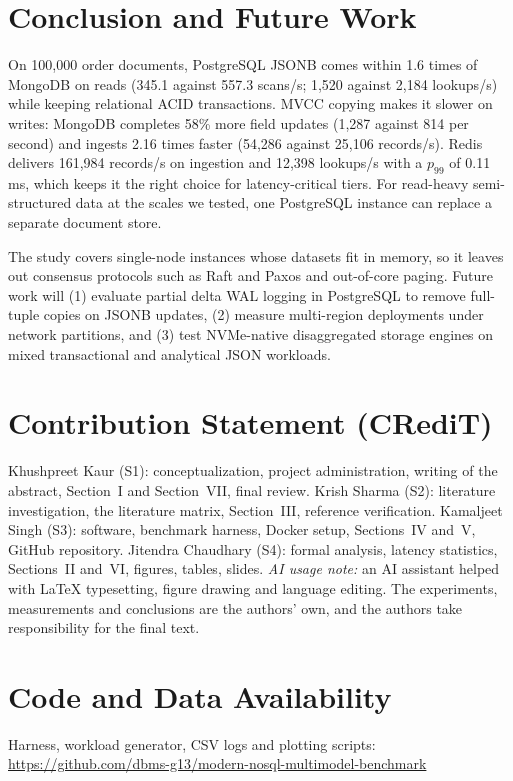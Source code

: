 \documentclass[conference,a4paper]{IEEEtran}
\begin{document}
\section{Conclusion and Future Work}
On 100,000 order documents, PostgreSQL JSONB comes within 1.6 times of MongoDB on reads (345.1 against 557.3 scans/s; 1,520 against 2,184 lookups/s) while keeping relational ACID transactions. MVCC copying makes it slower on writes: MongoDB completes 58\% more field updates (1,287 against 814 per second) and ingests 2.16 times faster (54,286 against 25,106 records/s). Redis delivers 161,984 records/s on ingestion and 12,398 lookups/s with a $p_{99}$ of 0.11\,ms, which keeps it the right choice for latency-critical tiers. For read-heavy semi-structured data at the scales we tested, one PostgreSQL instance can replace a separate document store.

The study covers single-node instances whose datasets fit in memory, so it leaves out consensus protocols such as Raft and Paxos and out-of-core paging. Future work will (1) evaluate partial delta WAL logging in PostgreSQL to remove full-tuple copies on JSONB updates, (2) measure multi-region deployments under network partitions, and (3) test NVMe-native disaggregated storage engines on mixed transactional and analytical JSON workloads.

\section*{Contribution Statement (CRediT)}
Khushpreet Kaur (S1): conceptualization, project administration, writing of the abstract, Section~I and Section~VII, final review. Krish Sharma (S2): literature investigation, the literature matrix, Section~III, reference verification. Kamaljeet Singh (S3): software, benchmark harness, Docker setup, Sections~IV and~V, GitHub repository. Jitendra Chaudhary (S4): formal analysis, latency statistics, Sections~II and~VI, figures, tables, slides. \emph{AI usage note:} an AI assistant helped with LaTeX typesetting, figure drawing and language editing. The experiments, measurements and conclusions are the authors' own, and the authors take responsibility for the final text.

\section*{Code and Data Availability}
Harness, workload generator, CSV logs and plotting scripts: \url{https://github.com/dbms-g13/modern-nosql-multimodel-benchmark}
\end{document}
